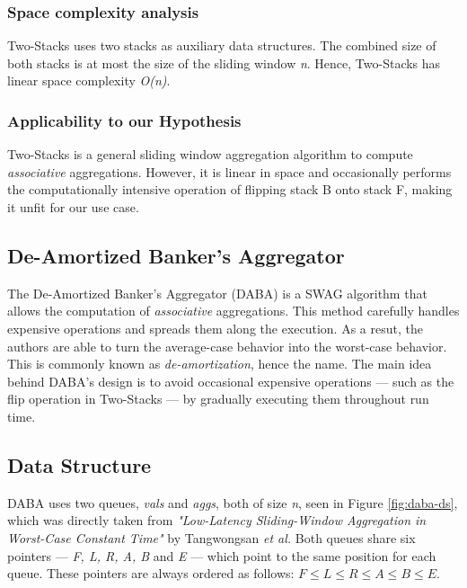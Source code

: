 \subsubsection*{Space complexity analysis}
Two-Stacks uses two stacks as auxiliary data structures. The combined size of both stacks is at most the size of the sliding window \textit{n}. Hence, Two-Stacks has linear space complexity \textit{O(n)}.

\subsubsection*{Applicability to our Hypothesis}
Two-Stacks is a general sliding window aggregation algorithm to compute \textit{associative} aggregations. However, it is linear in space and occasionally performs the computationally intensive operation of flipping stack B onto stack F, making it unfit for our use case.


\subsection{De-Amortized Banker’s Aggregator} \label{sec:daba}

The De-Amortized Banker’s Aggregator (DABA) \cite{Tangwongsan-DABA} is a SWAG algorithm that allows the computation of \textit{associative} aggregations. This method carefully handles expensive operations and spreads them along the execution. As a resut, the authors are able to turn the average-case behavior into the worst-case behavior. This is commonly known as \textit{de-amortization}, hence the name. The main idea behind DABA's design is to avoid occasional expensive operations --- such as the flip operation in Two-Stacks --- by gradually executing them throughout run time.

\subsection*{Data Structure}

DABA uses two queues, \textit{vals} and \textit{aggs}, both of size \textit{n}, seen in Figure \ref{fig:daba-ds}, which was directly taken from \textit{"Low-Latency Sliding-Window Aggregation in Worst-Case Constant Time"} by Tangwongsan \emph{et al.} Both queues share six pointers --- \textit{F, L, R, A, B} and \textit{E} --- which point to the same position for each queue. These pointers are always ordered as follows: $F \leq L \leq R \leq A \leq B \leq E$.

